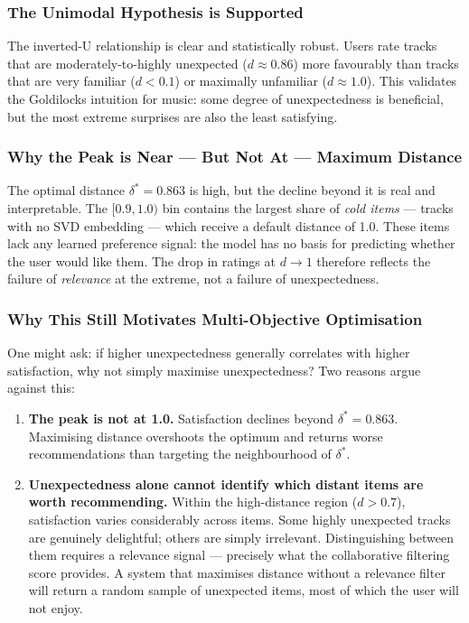 \subsubsection{The Unimodal Hypothesis is Supported}

The inverted-U relationship is clear and statistically robust.  Users rate
tracks that are moderately-to-highly unexpected ($d \approx 0.86$) more
favourably than tracks that are very familiar ($d < 0.1$) or maximally
unfamiliar ($d \approx 1.0$).  This validates the Goldilocks intuition for
music: some degree of unexpectedness is beneficial, but the most extreme
surprises are also the least satisfying.

\subsubsection{Why the Peak is Near --- But Not At --- Maximum Distance}

The optimal distance $\delta^* = 0.863$ is high, but the decline beyond it
is real and interpretable.  The $[0.9, 1.0)$ bin contains the largest share
of \emph{cold items} --- tracks with no SVD embedding --- which receive a
default distance of 1.0.  These items lack any learned preference signal:
the model has no basis for predicting whether the user would like them.  The
drop in ratings at $d \to 1$ therefore reflects the failure of \emph{relevance}
at the extreme, not a failure of unexpectedness.

\subsubsection{Why This Still Motivates Multi-Objective Optimisation}

One might ask: if higher unexpectedness generally correlates with higher
satisfaction, why not simply maximise unexpectedness?  Two reasons argue
against this:

\begin{enumerate}
    \item \textbf{The peak is not at 1.0.}  Satisfaction declines beyond
          $\delta^* = 0.863$.  Maximising distance overshoots the optimum and
          returns worse recommendations than targeting the neighbourhood of
          $\delta^*$.

    \item \textbf{Unexpectedness alone cannot identify which distant items are
          worth recommending.}  Within the high-distance region ($d > 0.7$),
          satisfaction varies considerably across items.  Some highly unexpected
          tracks are genuinely delightful; others are simply irrelevant.
          Distinguishing between them requires a relevance signal --- precisely
          what the collaborative filtering score provides.  A system that
          maximises distance without a relevance filter will return a random
          sample of unexpected items, most of which the user will not enjoy.
\end{enumerate}

